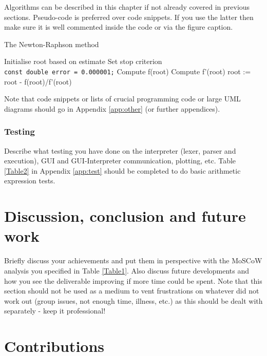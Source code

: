 \documentclass[a4paper, oneside, 11pt]{report}
\begin{document}
Algorithms can be described in this chapter if not already covered in previous sections. Pseudo-code is preferred over code snippets. If you use the latter then make sure it is well commented inside the code or via the figure caption. 

\begin{algorithm}[th]
\caption{ The Newton-Raphson method }
\begin{algorithmic}[1]
\STATE Initialise root based on estimate
\STATE Set stop criterion
\\ \texttt{const double error = 0.000001;}
	\STATE Compute f(root)
	\STATE Compute f'(root)
	\STATE root := root - f(root)/f'(root)
\ENDWHILE
\end{algorithmic}
\end{algorithm}


Note that code snippets or lists of crucial programming code or large UML diagrams should go in Appendix \ref{app:other} (or further appendices).

\subsection{Testing}

Describe what testing you have done on the interpreter (lexer, parser and execution), GUI and GUI-Interpreter communication, plotting, etc. Table \ref{Table2} in Appendix \ref{app:test} should be completed to do basic arithmetic expression tests.


\chapter{Discussion, conclusion and future work}

Briefly discuss  your achievements and put them in perspective with the MoSCoW analysis you specified in Table \ref{Table1}. Also discuss future developments and how you see the deliverable improving if more time could be spent. Note that this section should not be used as a medium to vent frustrations on whatever did not work out (group issues, not enough time, illness, etc.) as this should be dealt with separately - keep it professional!



\raggedright



\appendix
\chapter{Contributions}
\end{document}
